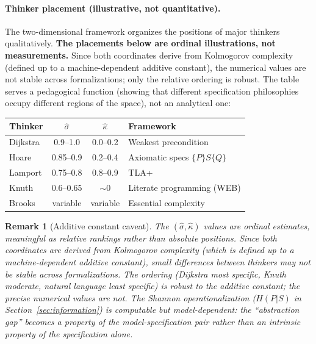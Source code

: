\documentclass[11pt, a4paper]{googledeepmind}
\newtheorem*{remark}{Remark}
\begin{document}
\paragraph{Thinker placement (illustrative, not quantitative).} The two-dimensional framework organizes the positions of major thinkers qualitatively. \textbf{The placements below are ordinal illustrations, not measurements.} Since both coordinates derive from Kolmogorov complexity (defined up to a machine-dependent additive constant), the numerical values are not stable across formalizations; only the relative ordering is robust. The table serves a pedagogical function (showing that different specification philosophies occupy different regions of the space), not an analytical one:

\begin{center}
\small
\begin{tabular}{lccl}
\toprule
\textbf{Thinker} & $\hat{\sigma}$ & $\hat{\kappa}$ & \textbf{Framework} \\
\midrule
Dijkstra & 0.9--1.0 & 0.0--0.2 & Weakest precondition \\
Hoare & 0.85--0.9 & 0.2--0.4 & Axiomatic specs $\{P\}S\{Q\}$ \\
Lamport & 0.75--0.8 & 0.8--0.9 & TLA+ \\
Knuth & 0.6--0.65 & $\sim$0 & Literate programming (WEB) \\
Brooks & variable & variable & Essential complexity \\
\bottomrule
\end{tabular}
\end{center}

\begin{remark}[Additive constant caveat]
The $(\hat{\sigma}, \hat{\kappa})$ values are ordinal estimates, meaningful as relative rankings rather than absolute positions. Since both coordinates are derived from Kolmogorov complexity (which is defined up to a machine-dependent additive constant), small differences between thinkers may not be stable across formalizations. The ordering (Dijkstra most specific, Knuth moderate, natural language least specific) is robust to the additive constant; the precise numerical values are not. The Shannon operationalization ($H(P|S)$ in Section~\ref{sec:information}) is computable but model-dependent: the ``abstraction gap'' becomes a property of the model-specification pair rather than an intrinsic property of the specification alone.
\end{remark}
\end{document}
